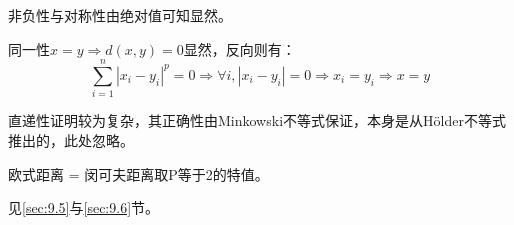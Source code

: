 非负性与对称性由绝对值可知显然。

同一性$x=y \Rightarrow d(x, y)=0$显然，反向则有：\[
\sum_{i=1}^{n}\left|x_{i}-y_{i}\right|^{p}=0 \Rightarrow \forall i,\left|x_{i}-y_{i}\right|=0 \Rightarrow x_{i}=y_{i} \Rightarrow x=y
\]

直递性证明较为复杂，其正确性由Minkowski不等式保证，本身是从Hölder不等式推出的，此处忽略。

欧式距离 = 闵可夫距离取P等于2的特值。

见\ref{sec:9.5}与\ref{sec:9.6}节。